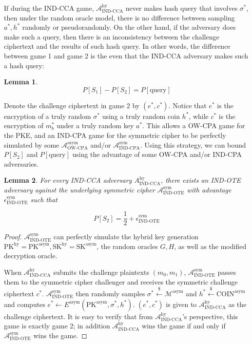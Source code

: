 \documentclass{article}
\newcommand{\leftsample}{\overset{{\scriptscriptstyle\$}}{\leftarrow}}
\newtheorem{lemma}{Lemma}
\begin{document}
If during the IND-CCA game, $\mathcal{A}^\text{hy}_\text{IND-CCA}$ never makes hash query that involves $\sigma^\ast$, then under the random oracle model, there is no difference between sampling $a^\ast, h^\ast$ randomly or pseudorandomly. On the other hand, if the adversary does make such a query, then there is an inconsistency between the challenge ciphertext and the results of such hash query. In other words, the difference between game 1 and game 2 is the even that the IND-CCA adversary makes such a hash query:

\begin{lemma}
    $$
    P[S_1] - P[S_2] = P[\text{query}]
    $$
\end{lemma}

Denote the challenge ciphertext in game 2 by $(e^\ast, c^\ast)$. Notice that $e^\ast$ is the encryption of a truly random $\sigma^\ast$ using a truly random coin $h^\ast$, while $c^\ast$ is the encryption of $m_b^\ast$ under a truly random key $a^\ast$. This allows a OW-CPA game for the PKE, and an IND-CPA game for the symmetric cipher to be perfectly simulated by some $\mathcal{A}^\text{asym}_\text{OW-CPA}$ and/or $\mathcal{A}^\text{sym}_\text{IND-CPA}$. Using this strategy, we can bound $P[S_2]$ and $P[\text{query}]$ using the advantage of some OW-CPA and/or IND-CPA adversaries.

\begin{lemma}\label{fo-bound-s2}
    For every IND-CCA adversary $A^\text{hy}_\text{IND-CCA}$, there exists an IND-OTE adversary against the underlying symmetric cipher $\mathcal{A}^\text{sym}_\text{IND-OTE}$ with advantage $\epsilon^\text{sym}_\text{IND-OTE}$ such that

    $$
    P[S_2] = \frac{1}{2} + \epsilon^\text{sym}_\text{IND-OTE}
    $$
\end{lemma}

\begin{proof}
    $\mathcal{A}^\text{sym}_\text{IND-OTE}$ can perfectly simulate the hybrid key generation $\text{PK}^\text{hy} = \text{PK}^\text{asym}, \text{SK}^\text{hy} = \text{SK}^\text{asym}$, the random oracles $G, H$, as well as the modified decryption oracle.
    
    When $\mathcal{A}^\text{hy}_\text{IND-CCA}$ submits the challenge plaintexts $(m_0, m_1)$, $\mathcal{A}^\text{sym}_\text{IND-OTE}$ passes them to the symmetric cipher challenger and receives the symmetric challenge ciphertext $c^\ast$. $\mathcal{A}^\text{sym}_\text{IND-OTE}$ then randomly samples $\sigma^\ast \leftsample \mathcal{M}^\text{asym}$ and $h^\ast \leftsample \text{COIN}^\text{asym}$ and computes $e^\ast \leftarrow E^\text{asym}(\text{PK}^\text{asym}, \sigma^\ast, h^\ast)$. $(e^\ast, c^\ast)$ is given to $\mathcal{A}^\text{hy}_\text{IND-CCA}$ as the challenge ciphertext. It is easy to verify that from $\mathcal{A}^\text{hy}_\text{IND-CCA}$'s perspective, this game is exactly game 2; in addition $\mathcal{A}^\text{hy}_\text{IND-CCA}$ wins the game if and only if $\mathcal{A}^\text{sym}_\text{IND-OTE}$ wins the game.
\end{proof}
\end{document}
